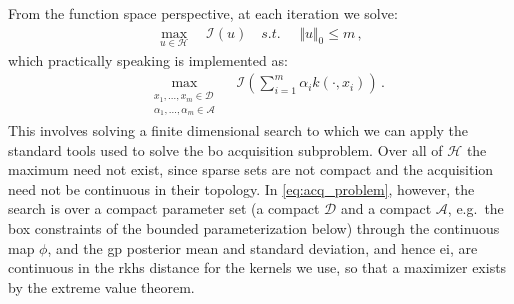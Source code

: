 \documentclass{article}
\newcommand{\D}{\mathcal{D}} %
\newcommand{\Hs}{\mathcal{H}}
\newcommand{\acq}{\mathcal{I}}
\newcommand{\vu}{u}
\begin{document}
From the function space perspective, at each iteration we solve:
\begin{align}
    \max_{u\in\Hs} \quad \acq(u) \quad s.t. \quad\,\,\Vert u \Vert_0 \leq m \,,
\end{align}
which practically speaking is implemented as:
\begin{align}
    &\max_{\substack{x_1, \ldots, x_m\in\D 
    \\\alpha_1, \ldots, \alpha_m\in\mathcal{A}}} 
    \quad 
    \acq\left(\sum_{i=1}^m
    \alpha_i k(\cdot,x_i)
    \right)  \,.
    \label{eq:acq_problem}
\end{align}
This involves solving a finite dimensional search to which we can apply the standard tools used to solve the \gls{bo} acquisition subproblem.
Over all of $\Hs$ the maximum need not exist, since sparse sets are not compact and the acquisition need not be continuous in their topology.
In \cref{eq:acq_problem}, however, the search is over a compact parameter set (a compact $\D$ and a compact $\mathcal{A}$, e.g.\ the box constraints of the bounded parameterization below) through the continuous map $\phi$, and the \gls{gp} posterior mean and standard deviation, and hence \gls{ei}, are continuous in the \gls{rkhs} distance for the kernels we use, so that a maximizer exists by the extreme value theorem.

\end{document}
